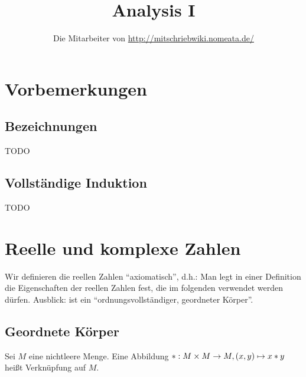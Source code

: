 \documentclass[12pt]{scrreprt}
\author{Die Mitarbeiter von \url{http://mitschriebwiki.nomeata.de/}}
\title{Analysis I}
\begin{document}
\maketitle

\tableofcontents

\setcounter{chapter}{-1}
\chapter{Vorbemerkungen}
\label{cha:vor}

\section{Bezeichnungen}
\label{sec:vor.bezeichnungen}
TODO

\section{Vollständige Induktion}
\label{sec:vor.vollstInd}
TODO

\chapter{Reelle und komplexe Zahlen}
\label{cha:zahlen}
Wir definieren die reellen Zahlen "`axiomatisch"', d.h.: Man legt in einer Definition die 
Eigenschaften der reellen Zahlen fest, die im folgenden verwendet werden dürfen.
Ausblick:  ist ein "`ordnungsvollständiger, geordneter Körper"'.

\section{Geordnete Körper}
\label{sec:zahlen.geordnete-koerper}
\begin{dfn*}
Sei $M$ eine nichtleere Menge. Eine Abbildung $\ast: M\times M \rightarrow M, (x, y) 
\mapsto x \ast y$ heißt Verknüpfung auf $M$.
\end{dfn*}
\end{document}
